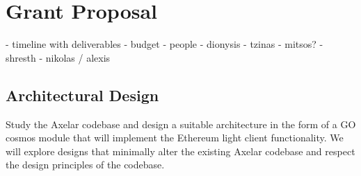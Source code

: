 \section{Grant Proposal}
- timeline with deliverables 
    - budget 
    - people 
        - dionysis
        - tzinas
        - mitsos?
        - shresth
        - nikolas / alexis
\subsection{Architectural Design}
Study the Axelar codebase and design a suitable architecture in the form of a GO cosmos module that will implement the Ethereum light client functionality. 
We will explore designs that minimally alter the existing Axelar codebase and respect the design principles of the codebase. 

